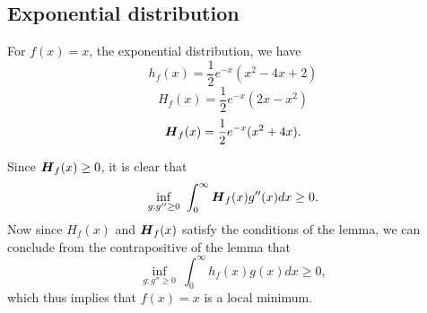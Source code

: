 \documentclass[11pt]{article}
\begin{document}
\subsection{Exponential distribution}

For $f(x) = x$, the exponential distribution, we have
\[
h_f(x) = \frac{1}{2}e^{-x}(x^2 - 4x + 2)
\]
\[
H_f(x) = \frac{1}{2}e^{-x}(2x-x^2)
\]
\[
\boldsymbol{H}_f(x) = \frac{1}{2}e^{-x}(x^2 + 4x).
\]

Since $\boldsymbol{H}_f(x) \geq 0$, it is clear that
\[
\inf_{g: g'' \geq 0}\ \int_0^\infty \boldsymbol{H}_f(x) g''(x) dx \geq 0.
\]
Now since $H_f(x)$ and $\boldsymbol{H}_f(x)$ satisfy the conditions of the lemma, we can conclude from the contrapositive of the lemma that
\[
\inf_{g: g'' \geq 0}\ \int_0^\infty h_f(x) g(x) dx \geq 0,
\]
which thus implies that $f(x) = x$ is a local minimum.
\end{document}
